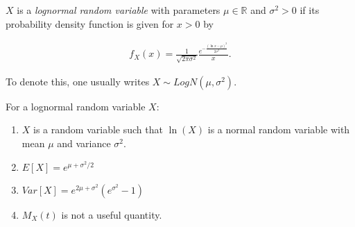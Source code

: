 \documentclass{article}
\def\R{\mathbb{R}}
\begin{document}
$X$ is a \emph{lognormal random variable} with parameters $\mu\in\R$ and $\sigma^2>0$ if its probability density function is given for $x>0$ by

\begin{align*}
f_X(x) = \frac{1}{\sqrt{2 \pi \sigma^2}} \frac{e^{-\frac{(\ln{x}-\mu)^2}{2 \sigma^2}}}{x}.
\end{align*}

To denote this, one usually writes $X\sim LogN(\mu,\sigma^2)$.


For a lognormal random variable $X$:
\begin{enumerate}
\item $X$ is a random variable such that $\ln(X)$ is a normal random variable with mean $\mu$ and variance $\sigma^2$.
\item $E[X] = e^{\mu + \sigma^2/2}$
\item $Var[X] = e^{2\mu + \sigma^2}(e^{\sigma^2} - 1)$
\item $M_X(t)$ is not a useful quantity.

\end{enumerate}
\end{document}
